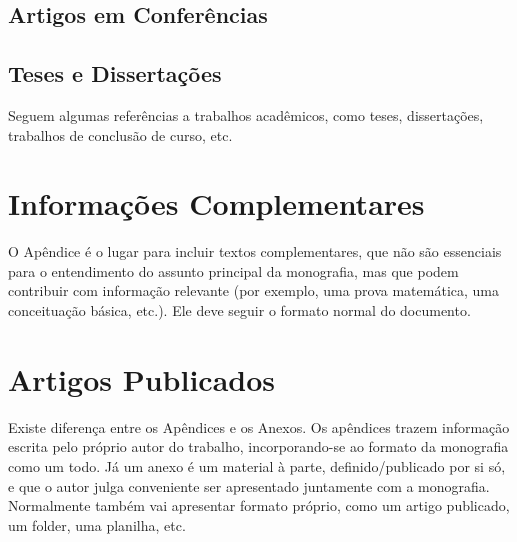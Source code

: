 \documentclass[twoside,english,brazilian]{UNISINOSmonografia}
\begin{document}
\section{Artigos em Conferências}

\section{Teses e Dissertações}
Seguem algumas referências a trabalhos acadêmicos, como teses, dissertações, trabalhos de conclusão de curso, etc.



\appendix
\chapter{Informações Complementares}

O Apêndice é o lugar para incluir textos complementares, que não são essenciais para o entendimento do assunto principal da monografia, mas que podem contribuir com informação relevante (por exemplo, uma prova matemática, uma conceituação básica, etc.).  Ele deve seguir o formato normal do documento.

\annex
\chapter{Artigos Publicados}
Existe diferença entre os Apêndices e os Anexos.  Os apêndices trazem informação escrita pelo próprio autor do trabalho, incorporando-se ao formato da monografia como um todo.  Já um anexo é um material à parte, definido/publicado por si só, e que o autor julga conveniente ser apresentado juntamente com a monografia.  Normalmente também vai apresentar formato próprio, como um artigo publicado, um folder, uma planilha, etc.
\end{document}
